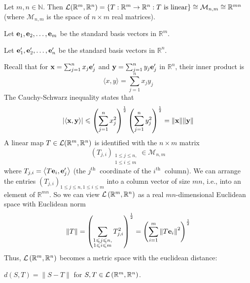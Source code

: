 \documentclass[a4paper]{article}
\begin{document}
Let $m, n \in \mathbb{N}$. Then ${\mathcal{L}}(\mathbb{R}^{m}, \mathbb{R}^{n})=\{T: \mathbb{R}^{m} \rightarrow \mathbb{R}^{n}: T \text{ is linear} \} \cong \mathcal{M}_{n, m} \cong \mathbb{R}^{m n}$ (where $\mathcal{M}_{n, m}$ is the space of $n \times m$ real matrices).

Let ${\bf e}_{1}, {\bf e}_{2}, \ldots, {\bf e}_{m}$ be the standard basis vectors in $\mathbb{R}^{m}$.

Let ${\bf e}_{1}^{\prime}, {\bf e}_{2}^{\prime}, \ldots, {\bf e}_{n}^{\prime}$ be the standard basis vectors in $\mathbb{R}^{n}$.

Recall that for ${\bf x}=\sum_{j=1}^{n} x_{j} {\bf e}_{j}^{\prime}$ and ${\bf y}=\sum_{j=1}^{n} y_{j} {\bf e}_{j}^{\prime}$ in $\mathbb{R}^{n}$, their inner product is
$$
\langle x, y\rangle=\sum_{j=1}^{n} x_{j} y_{j}
$$
The Cauchy-Schwarz inequality states that
$$
|\langle {\bf x}, {\bf y}\rangle| \leqslant\left(\sum_{j=1}^{n} x_{j}^{2}\right)^{\frac{1}{2}}\left(\sum_{j=1}^{n} y_{j}^{2}\right)^{\frac{1}{2}}=\|{\bf x}\|\|{\bf y}\|
$$
A linear map $T \in {\mathcal{L}}(\mathbb{R}^{m}, \mathbb{R}^{n})$ is identified with the $n \times m$ matrix
$$
\left(T_{j, i}\right)_{\substack{1 \leqslant j \leqslant n,\\ 1 \leqslant i \leqslant m}} \in \mathcal{M}_{n, m}
$$
where $T_{j, i}=\left\langle T {\bf e}_{i}, {\bf e}_{j}^{\prime}\right\rangle$ (the $j^{\text {th }}$ coordinate of the $i^{\text {th }}$ column). We can arrange the entries $\left(T_{j, i}\right)_{1 \leqslant j \leqslant n, 1 \leqslant i \leqslant m}$ into a column vector of size $m n$, i.e., into an element of $\mathbb{R}^{m n}$. So we can view ${\mathcal{L}}\left(\mathbb{R}^{m}, \mathbb{R}^{n}\right)$ as a real $mn$-dimensional Euclidean space with Euclidean norm
$$
\|T\|=\left(\sum_{\substack{1 \leqslant j \leqslant n,\\ 1 \leqslant i \leqslant m}} T_{j, i}^{2}\right)^{\frac{1}{2}}=\left(\sum_{i=1}^{m}\left\|T {\bf e}_{i}\right\|^{2}\right)^{\frac{1}{2}}
$$
Thus, ${\mathcal{L}}\left(\mathbb{R}^{m}, \mathbb{R}^{n}\right)$ becomes a metric space with the euclidean distance:

$d(S, T)=\|S-T\|$ for $S, T \in {\mathcal{L}}\left(\mathbb{R}^{m}, \mathbb{R}^{n}\right)$.
\end{document}
